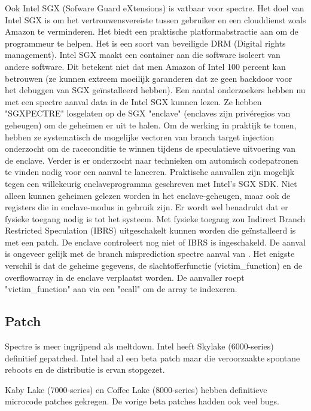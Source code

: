 Ook Intel SGX (Sofware Guard eXtensions) is vatbaar voor spectre. 
Het doel van Intel SGX is om het vertrouwensvereiste tussen gebruiker en een clouddienst zoals Amazon te verminderen.
Het biedt een praktische platformabstractie aan om de programmeur te helpen. 
Het is een soort van beveiligde DRM (Digital rights management).
Intel SGX maakt een container aan die software isoleert van andere software.
Dit betekent niet dat men Amazon of Intel 100 percent kan betrouwen (ze kunnen extreem moeilijk garanderen dat ze geen backdoor voor het debuggen van SGX geïnstalleerd hebben).
Een aantal onderzoekers hebben nu met een spectre aanval data in de Intel SGX kunnen lezen.
Ze hebben "SGXPECTRE" losgelaten op de SGX "enclave" (enclaves zijn privéregios van geheugen) om de geheimen er uit te halen.
Om de werking in praktijk te tonen, hebben ze systematisch de mogelijke vectoren van branch target injection onderzocht om de raceconditie te winnen tijdens de speculatieve uitvoering van de enclave. Verder is er onderzocht naar technieken om automisch codepatronen te vinden nodig voor een aanval te lanceren. Praktische aanvallen zijn mogelijk tegen een willekeurig  enclaveprogramma geschreven met Intel's SGX SDK. Niet alleen kunnen geheimen gelezen worden in het enclave-geheugen, maar ook de registers die in enclave-modus in gebruik zijn.\parencite{Chen2018}
Er wordt wel benadrukt dat er fysieke toegang nodig is tot het systeem. Met fysieke toegang zou Indirect Branch Restricted Speculation (IBRS) uitgeschakelt kunnen worden die geïnstalleerd is met een patch.
De enclave controleert nog niet of IBRS is ingeschakeld.
De aanval is ongeveer gelijk met de branch misprediction spectre aanval van \parencite{kocher}. Het enigste verschil is dat de geheime gegevens, de slachtofferfunctie (victim_function) en de overflowarray in de enclave verplaatst worden.
De aanvaller roept "victim_function" aan via een "ecall" om de array te indexeren. \parencite{Tian2018}



\subsection{Patch}
Spectre is meer ingrijpend als meltdown.
Intel heeft Skylake (6000-series) definitief gepatched.
Intel had al een beta patch maar die veroorzaakte spontane reboots en de distributie is ervan stopgezet.

Kaby Lake (7000-series) en Coffee Lake (8000-series) hebben definitieve microcode patches gekregen. De vorige beta patches hadden ook veel bugs.

